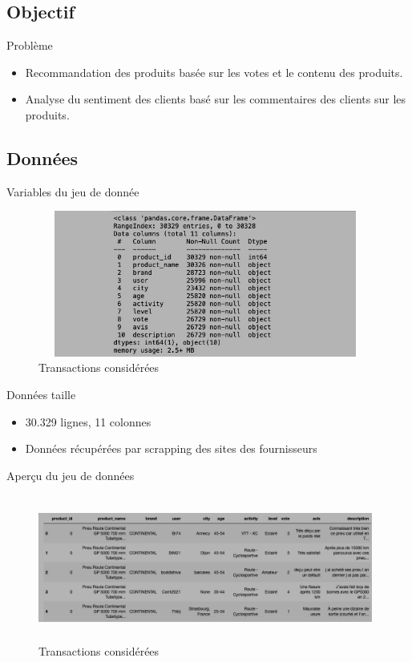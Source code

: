 \documentclass[xelatex,12pt]{beamer}
\begin{document}
\subsection{Objectif}

\begin{frame}{Problème}
  \begin{itemize}
  \item Recommandation des produits basée sur les votes et le contenu des produits.
  \item Analyse du sentiment des clients basé sur les commentaires des clients sur les produits.
  \end{itemize}
\end{frame}

\subsection{Données}
\begin{frame}{Variables du jeu de donnée}
\begin{figure}[H]
    \includegraphics[width=11cm,height=4.8cm]{images/features.jpeg}
    \caption{ Transactions considérées}
    \label{fig:L1}
\end{figure}
\end{frame}
\begin{frame}{Données taille}
  \begin{itemize}
  \item 30.329 lignes, 11 colonnes
  \item Données récupérées par scrapping des sites des fournisseurs 
  \end{itemize}
\end{frame}

\begin{frame}{Aperçu du jeu de données}
\begin{figure}[H]
    \includegraphics[width=11cm,height=4.8cm]{images/sample_data.jpeg}
    \caption{ Transactions considérées}
    \label{fig:L1}
\end{figure}
\end{frame} 
\end{document}
